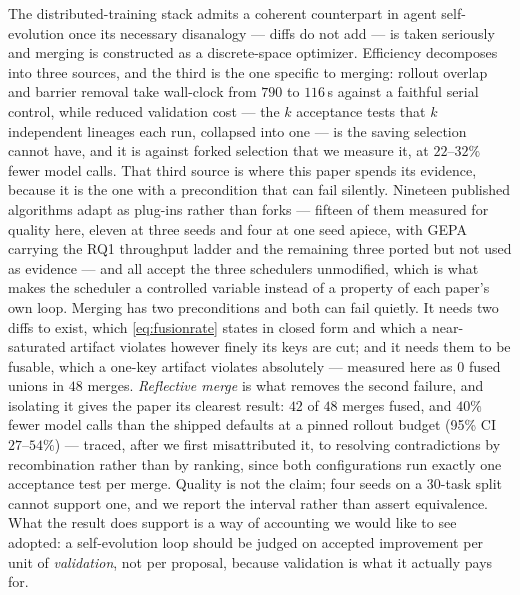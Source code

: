 \documentclass{article}
\begin{document}
The distributed-training stack admits a coherent counterpart in agent self-evolution once its necessary disanalogy --- diffs do not add --- is taken seriously and merging is constructed as a discrete-space optimizer. Efficiency decomposes into three sources, and the third is the one specific to merging: rollout overlap and barrier removal take wall-clock from $790$ to $116$\,s against a faithful serial control, while reduced validation cost --- the $k$ acceptance tests that $k$ independent lineages each run, collapsed into one --- is the saving selection cannot have, and it is against forked selection that we measure it, at $22$--$32\%$ fewer model calls. That third source is where this paper spends its evidence, because it is the one with a precondition that can fail silently. Nineteen published algorithms adapt as plug-ins rather than forks --- fifteen of them measured for quality here, eleven at three seeds and four at one seed apiece, with GEPA carrying the RQ1 throughput ladder and the remaining three ported but not used as evidence --- and all accept the three schedulers unmodified, which is what makes the scheduler a controlled variable instead of a property of each paper's own loop. Merging has two preconditions and both can fail quietly. It needs two diffs to exist, which \cref{eq:fusionrate} states in closed form and which a near-saturated artifact violates however finely its keys are cut; and it needs them to be fusable, which a one-key artifact violates absolutely --- measured here as $0$ fused unions in $48$ merges. \emph{Reflective merge} is what removes the second failure, and isolating it gives the paper its clearest result: $42$ of $48$ merges fused, and $40\%$ fewer model calls than the shipped defaults at a pinned rollout budget (95\% CI $27$--$54\%$) --- traced, after we first misattributed it, to resolving contradictions by recombination rather than by ranking, since both configurations run exactly one acceptance test per merge. Quality is not the claim; four seeds on a 30-task split cannot support one, and we report the interval rather than assert equivalence. What the result does support is a way of accounting we would like to see adopted: a self-evolution loop should be judged on accepted improvement per unit of \emph{validation}, not per proposal, because validation is what it actually pays for.
\end{document}
